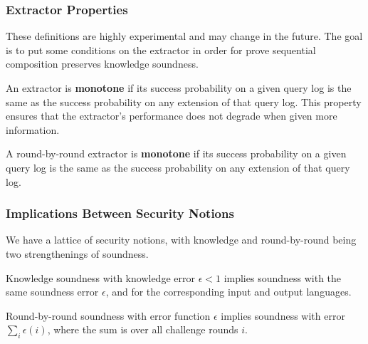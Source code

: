 \subsubsection{Extractor Properties}

These definitions are highly experimental and may change in the future. The goal is to put some conditions on the extractor in order for prove sequential composition preserves knowledge soundness.

\begin{definition}
    \label{def:monotone_straightline_extractor}
    An extractor is \textbf{monotone} if its success probability on a given query log is the same as
    the success probability on any extension of that query log. This property ensures that the extractor's
    performance does not degrade when given more information.
\end{definition}

\begin{definition}
    \label{def:monotone_rbr_extractor}
    A round-by-round extractor is \textbf{monotone} if its success probability on a given query log
    is the same as the success probability on any extension of that query log.
\end{definition}

\subsubsection{Implications Between Security Notions}

We have a lattice of security notions, with knowledge and round-by-round being two strengthenings of soundness.

\begin{theorem}
    \label{thm:knowledge_soundness_implies_soundness}
    Knowledge soundness with knowledge error $\epsilon < 1$ implies soundness with the same
    soundness error $\epsilon$, and for the corresponding input and output languages.
\end{theorem}

\begin{theorem}
    \label{thm:rbr_soundness_implies_soundness}
    Round-by-round soundness with error function $\epsilon$ implies soundness with error
    $\sum_i \epsilon(i)$, where the sum is over all challenge rounds $i$.
\end{theorem}

